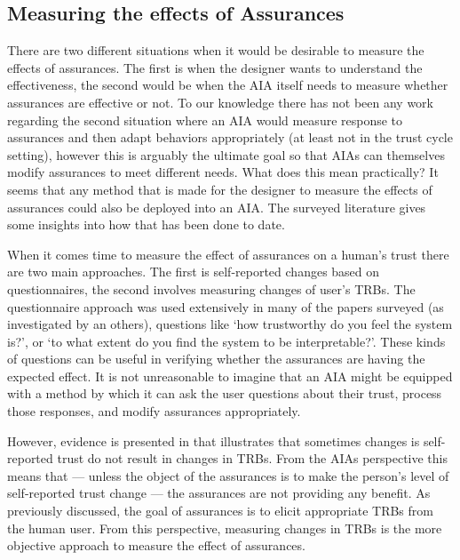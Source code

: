\subsection{Measuring the effects of Assurances} \label{sec:measuring_effects}

    There are two different situations when it would be desirable to measure the effects of assurances. The first is when the designer wants to understand the effectiveness, the second would be when the AIA itself needs to measure whether assurances are effective or not. To our knowledge there has not been any work regarding the second situation where an AIA would measure response to assurances and then adapt behaviors appropriately (at least not in the trust cycle setting), however this is arguably the ultimate goal so that AIAs can themselves modify assurances to meet different needs. What does this mean practically? It seems that any method that is made for the designer to measure the effects of assurances could also be deployed into an AIA. The surveyed literature gives some insights into how that has been done to date.
   
    When it comes time to measure the effect of assurances on a human's trust there are two main approaches. The first is self-reported changes based on questionnaires, the second involves measuring changes of user's TRBs. The questionnaire approach was used extensively in many of the papers surveyed (as investigated by \cite{Mcknight2011-gv,Muir1996-gt,Wickens1999-la,Salem2015-md,Kaniarasu2013-ho} an others), questions like `how trustworthy do you feel the system is?', or `to what extent do you find the system to be interpretable?'. These kinds of questions can be useful in verifying whether the assurances are having the expected effect. It is not unreasonable to imagine that an AIA might be equipped with a method by which it can ask the user questions about their trust, process those responses, and modify assurances appropriately.
    
    However, evidence is presented in \cite{Dzindolet2003-ts} that illustrates that sometimes changes is self-reported trust do not result in changes in TRBs. From the AIAs perspective this means that --- unless the object of the assurances is to make the person's level of self-reported trust change --- the assurances are not providing any benefit. As previously discussed, the goal of assurances is to elicit appropriate TRBs from the human user. From this perspective, measuring changes in TRBs is the more objective approach to measure the effect of assurances.

